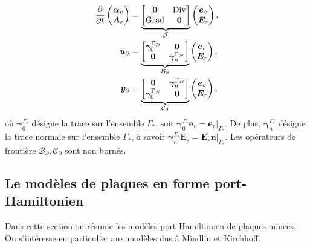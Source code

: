 \begin{equation}
\begin{aligned}
\displaystyle
\diffp{}{t}
\begin{pmatrix}
\bm{\alpha}_v \\
\bm{A}_\varepsilon
\end{pmatrix} &= \underbrace{
	\begin{bmatrix}
	\bm{0} & \Div \\
	\Grad & \bm{0} \\
	\end{bmatrix}}_{\mathcal{J}}
\begin{pmatrix}
\bm{e}_v \\
\bm{E}_\varepsilon
\end{pmatrix}, \vspace{3pt}\\
\bm{u}_\partial &= \underbrace{
	\begin{bmatrix}
	\bm\gamma_{0}^{\Gamma_D} & \bm{0} \\
	\bm{0} & \bm\gamma_n^{\Gamma_N} \\
	\end{bmatrix}}_{\mathcal{B}_\partial} \begin{pmatrix}
\bm{e}_v \\
\bm{E}_\varepsilon
\end{pmatrix}, \vspace{3pt}\\
\bm{y}_\partial &= \underbrace{
	\begin{bmatrix}
	\bm{0} & \bm\gamma_{n}^{\Gamma_D} \\
	\bm\gamma_0^{\Gamma_N} & \bm{0} \\
	\end{bmatrix}}_{\mathcal{C}_\partial}
\begin{pmatrix}
\bm{e}_v \\
\bm{E}_\varepsilon
\end{pmatrix},
\end{aligned}
\end{equation}
où $\bm\gamma_{0}^{\Gamma_*}$ désigne la trace sur l'ensemble $\Gamma_* $, soit $ \bm\gamma_{0}^{\Gamma_*} \bm{e}_v = \bm{e}_v \vert_{\Gamma_*} $. De plus, $ \bm\gamma_{n}^{\Gamma_*} $ désigne la trace normale sur l'ensemble $\Gamma_*$, à savoir $\bm\gamma_{n}^{\Gamma_*} \bm{E}_\varepsilon = \bm{E}_\varepsilon \bm{n} \vert_{\Gamma_*}$. Les opérateurs de frontière $\mathcal{B}_\partial, \mathcal{C}_\partial $ sont non bornés.

\subsection{Le modèles de plaques en forme port-Hamiltonien}
Dans cette section on résume les modèles port-Hamiltonien de plaques minces. On s'intéresse en particulier aux modèles dus à Mindlin \cite{mindlin1951} et Kirchhoff. 

